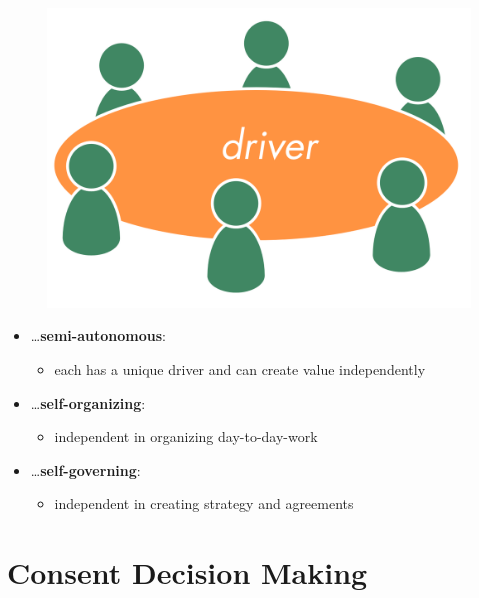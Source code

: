 \begin{figure}[htbp]
\centering
\includegraphics[keepaspectratio,width=\textwidth,height=0.75\textheight]{img/circle/circle-driver.png}
\end{figure}

\begin{itemize}
\item {\ldots}\textbf{semi-autonomous}:

\begin{itemize}
\item each has a unique driver and can create value independently

\end{itemize}

\item {\ldots}\textbf{self-organizing}:

\begin{itemize}
\item independent in organizing day-to-day-work

\end{itemize}

\item {\ldots}\textbf{self-governing}:

\begin{itemize}
\item independent in creating strategy and agreements

\end{itemize}

\end{itemize}

\section{Consent Decision Making}
\label{consentdecisionmaking}

